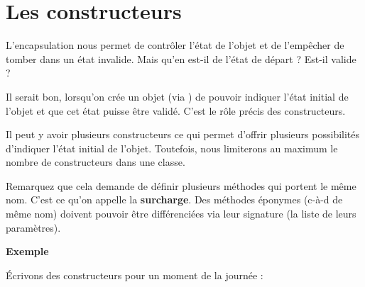 \section{Les constructeurs}

L'encapsulation nous permet de contrôler
l'état de l'objet et de
l'empêcher de tomber dans un état invalide. Mais
qu'en est-il de l'état de départ ?
Est-il valide ?

Il serait bon, lorsqu'on crée un objet (via
) de pouvoir indiquer l'état
initial de l'objet et que cet état puisse être validé.
C'est le rôle précis des constructeurs.

{\sffamily\bfseries{}}

Il peut y avoir plusieurs constructeurs ce qui permet
d'offrir plusieurs possibilités d'indiquer l'état initial de
l'objet. Toutefois, nous limiterons au maximum le nombre 
de constructeurs dans une classe.

Remarquez que cela demande de définir plusieurs méthodes 
qui portent le même nom. C'est ce qu'on appelle la
\textbf{surcharge}. Des méthodes éponymes (c-à-d de même nom) doivent
pouvoir être différenciées via leur signature (la liste de leurs
paramètres).

{\bfseries
Exemple}

Écrivons des constructeurs pour un moment de la journée :


